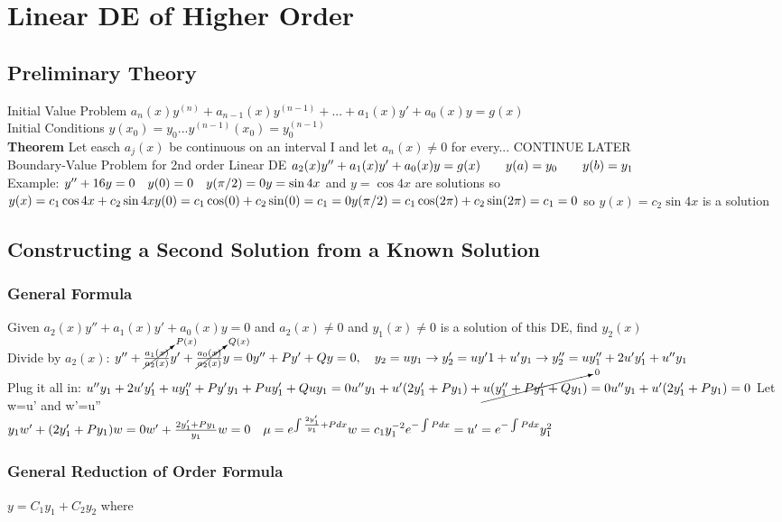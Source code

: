\documentclass{article}
\begin{document}
\section{Linear DE of Higher Order}
\subsection{Preliminary Theory}
Initial Value Problem $a_n(x)y^{(n)}+a_{n-1}(x)y^{(n-1)}+...+a_1(x)y'+a_0(x)y=g(x)$
\\Initial Conditions $y(x_0)=y_0...y^{(n-1)}(x_0)=y_0^{(n-1)}$
\\\textbf{Theorem} Let easch $a_j(x)$ be continuous on an interval I and let $a_n(x)\neq 0$ for every... CONTINUE LATER
\\Boundary-Value Problem for 2nd order Linear DE $a_2(x)y''+a_1(x)y'+a_0(x)y=g(x)\\  \qquad y(a)=y_0 \qquad y(b)=y_1$
\\Example: $y''+16y=0 \quad y(0)=0 \quad y(\pi/2) = 0
\\y=\sin 4x$ and $y=\cos 4x$ are solutions so $y(x)=c_1\cos 4x+ c_2 \sin 4x
\\y(0) = c_1\cos(0)+c_2\sin(0) =c_1= 0
\\y(\pi/2) = c_1\cos(2\pi)+c_2\sin(2\pi) =c_1= 0
$ so $y(x)=c_2\sin 4x$ is a solution

\subsection{Constructing a Second Solution from a Known Solution}

\subsubsection*{General Formula} Given $a_2(x)y''+a_1(x)y'+a_0(x)y=0$ and $a_2(x) \neq 0$ and $y_1(x) \neq 0$ is a solution of this DE, find $y_2(x)$
\\Divide by $a_2(x)$: $y''+\cancelto{P(x)}{\frac{a_1(x)}{a_2(x)}}y'+\cancelto{Q(x)}{\frac{a_0(x)}{a_2(x)}}y=0
\\y''+Py'+Qy=0, \quad y_2=uy_1 \rightarrow y_2'=uy'1+u'y_1 \rightarrow y_2''=uy_1''+2u'y_1'+u''y_1$ 
\\Plug it all in: $u''y_1+2u'y_1'+uy_1''+Py'y_1+Puy_1'+Quy_1=0
\\u''y_1+u'(2y_1'+Py_1)+\cancelto{0}{u(y_1''+Py_1'+Qy_1)}=0
\\u''y_1+u'(2y_1'+Py_1)=0$ Let w=u' and w'=u''
\\$y_1w'+(2y_1'+Py_1)w=0
\\ w'+\frac{2y_1'+Py_1}{y_1}w=0 \quad \mu = e^{\int \frac{2y_1'}{y_1}+P dx}
\\w=c_1y_1^{-2}e^{-\int P dx}=u' = {e^{-\int P dx}}{y_1^2}$
\\\subsubsection{General Reduction of Order Formula} $y=C_1y_1+C_2y_2$ where 
\end{document}
